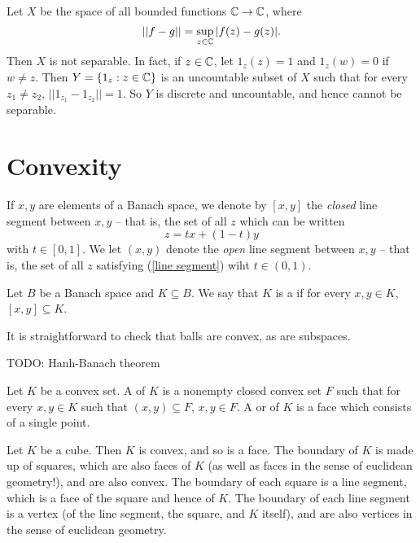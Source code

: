 \begin{example}
\label{nonseparable space}
Let $X$ be the space of all bounded functions $\mathbb{C} \to \mathbb{C}$, where
$$||f - g|| = \sup_{z \in \mathbb{C}}|f(z) - g(z)|.$$
Then $X$ is not separable. In fact, if $z \in \mathbb{C}$, let $1_z(z) = 1$ and $1_z(w) = 0$ if $w \neq z$.
Then $Y=\{1_z: z \in \mathbb{C}\}$ is an uncountable subset of $X$ such that for every $z_1 \neq z_2$, $||1_{z_1} - 1_{z_2}|| =1$.
So $Y$ is discrete and uncountable, and hence cannot be separable.
\end{example}

\section{Convexity}
\begin{subsec}
If $x, y$ are elements of a Banach space, we denote by $[x, y]$ the \emph{closed} line segment between $x, y$ -- that is, the set of all $z$ which can be written
\begin{equation}
\label{line segment}
z = tx + (1 - t)y
\end{equation}
with $t \in [0, 1]$.
We let $(x, y)$ denote the \emph{open} line segment between $x, y$ -- that is, the set of all $z$ satisfying (\ref{line segment}) wiht $t \in (0, 1)$.
\end{subsec}

\begin{definition}
Let $B$ be a Banach space and $K \subseteq B$. We say that $K$ is a  if for every $x, y \in K$, $[x, y] \subseteq K$.
\end{definition}

\begin{subsec}
It is straightforward to check that balls are convex, as are subspaces.
\end{subsec}

TODO: Hanh-Banach theorem

\begin{definition}
Let $K$ be a convex set. A  of $K$ is a nonempty closed convex set $F$ such that for every $x,y \in K$ such that $(x, y) \subseteq F$, $x, y \in F$.
A  or  of $K$ is a face which consists of a single point.
\end{definition}

\begin{example}
\label{cube is convex}
Let $K$ be a cube. Then $K$ is convex, and so is a face. The boundary of $K$ is made up of squares, which are also faces of $K$ (as well as faces in the sense of euclidean geometry!), and are also convex. The boundary of each square is a line segment, which is a face of the square and hence of $K$. The boundary of each line segment is a vertex (of the line segment, the square, and $K$ itself), and are also vertices in the sense of euclidean geometry.
\end{example}

